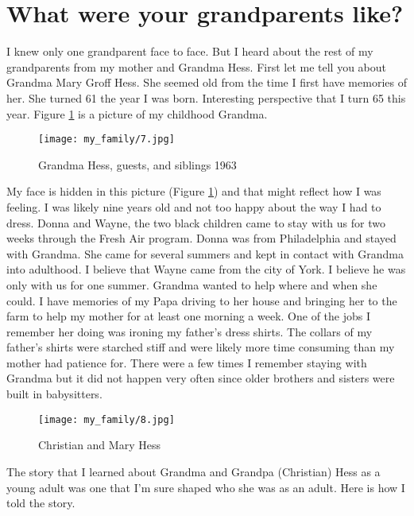 \section{What were your grandparents like?}
I knew only one grandparent face to face. But I heard about the rest of my grandparents from my mother and Grandma Hess. 
First let me tell you about Grandma Mary Groff Hess. She seemed old from the time I first have memories of her. She turned 61 the year I was born.  Interesting perspective that I turn 65 this year. Figure \ref{grandma-hess} is a picture of my childhood Grandma.
\begin{figure}[h!]
\centering
\texttt{[image: my\_family/7.jpg]}
\caption{Grandma Hess, guests, and siblings 1963}
\label{grandma-hess}
\end{figure}

My face is hidden in this picture (Figure \ref{grandma-hess}) and that might reflect how I was feeling. I was likely nine years old and not too happy about the way I had to dress. Donna and Wayne, the two black children came to stay with us for two weeks through the Fresh Air program. Donna was from Philadelphia and stayed with Grandma. She came for several summers and kept in contact with Grandma into adulthood. I believe that Wayne came from the city of York. I believe he was only with us for one summer. Grandma wanted to help where and when she could. I have memories of my Papa driving to her house and bringing her to the farm to help my mother for at least one morning a week. One of the jobs I remember her doing was ironing my father's dress shirts. The collars of my father's shirts were starched stiff and were likely more time consuming than my mother had patience for. There were a few times I remember staying with Grandma but it did not happen very often since older brothers and sisters were built in babysitters. 

\begin{figure}
\centering
\texttt{[image: my\_family/8.jpg]}
\caption{Christian and Mary Hess}
\label{christian-mary-hess}
\end{figure}
The story that I learned about Grandma and Grandpa (Christian) Hess as a young adult was one that I'm sure shaped who she was as an adult. Here is how I told the story.

